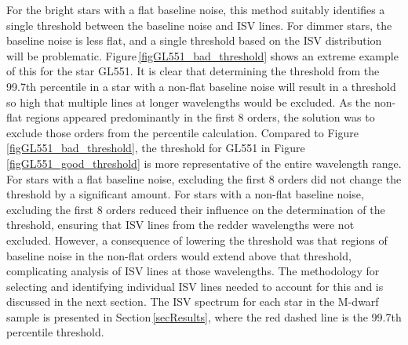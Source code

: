 For the bright stars with a flat baseline noise, this method suitably identifies a single threshold between the baseline noise and ISV lines. For dimmer stars, the baseline noise is less flat, and a single threshold based on the ISV distribution will be problematic. Figure\,\ref{figGL551_bad_threshold} shows an extreme example of this for the star GL551. It is clear that determining the threshold from the 99.7th percentile in a star with a non-flat baseline noise will result in a threshold so high that multiple lines at longer wavelengths would be excluded. As the non-flat regions appeared predominantly in the first 8 orders, the solution was to exclude those orders from the percentile calculation. Compared to Figure\,\ref{figGL551_bad_threshold}, the threshold for GL551 in Figure\,\ref{figGL551_good_threshold} is more representative of the entire wavelength range. For stars with a flat baseline noise, excluding the first 8 orders did not change the threshold by a significant amount. For stars with a non-flat baseline noise, excluding the first 8 orders reduced their influence on the determination of the threshold, ensuring that ISV lines from the redder wavelengths were not excluded. However, a consequence of lowering the threshold was that regions of baseline noise in the non-flat orders would extend above that threshold, complicating analysis of ISV lines at those wavelengths. The methodology for selecting and identifying individual ISV lines needed to account for this and is discussed in the next section. The ISV spectrum for each star in the M-dwarf sample is presented in Section\,\ref{secResults}, where the red dashed line is the 99.7th percentile threshold.\\

